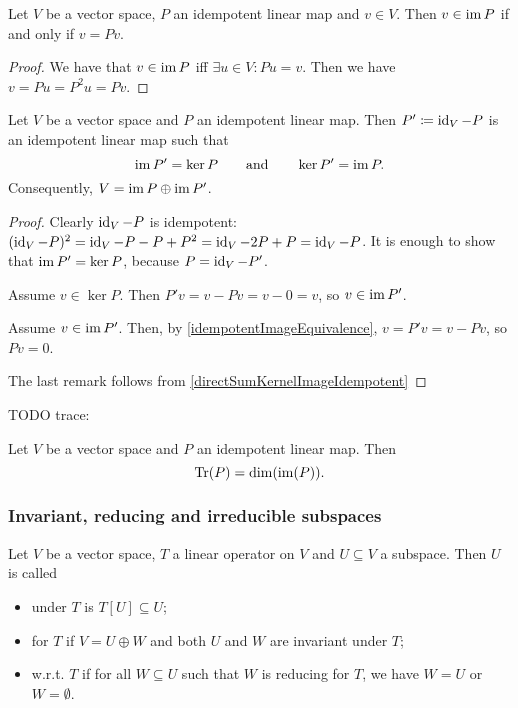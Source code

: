 \begin{lemma} \label{idempotentImageEquivalence}
Let $V$ be a vector space, $P$ an idempotent linear map and $v\in V$. Then $v\in \operatorname{im} P$ \textup{if and only if} $v = Pv$.
\end{lemma}
\begin{proof}
We have that $v\in \operatorname{im} P$ iff $\exists u\in V: Pu = v$. Then we have $v = Pu = P^2u = Pv$.
\end{proof}

\begin{lemma}
Let $V$ be a vector space and $P$ an idempotent linear map. Then $P' \coloneqq \operatorname{id}_V - P$ is an idempotent linear map such that
\[ \operatorname{im} P' = \ker P \qquad\text{and}\qquad \ker P' = \operatorname{im} P. \]
Consequently, $V = \operatorname{im} P\oplus \operatorname{im} P'$.
\end{lemma}
\begin{proof}
Clearly $\operatorname{id}_V - P$ is idempotent: $(\operatorname{id}_V - P)^2 = \operatorname{id}_V - P - P + P^2 = \operatorname{id}_V - 2P + P = \operatorname{id}_V - P$. It is enough to show that $\operatorname{im} P' = \ker P$, because $P = \operatorname{id}_V - P'$.

Assume $v\in \ker P$. Then $P'v = v - Pv = v-0 = v$, so $v\in \operatorname{im} P'$.

Assume $v\in \operatorname{im} P'$. Then, by \ref{idempotentImageEquivalence}, $v = P'v = v - Pv$, so $Pv = 0$.

The last remark follows from \ref{directSumKernelImageIdempotent}
\end{proof}



TODO trace:
\begin{lemma}
Let $V$ be a vector space and $P$ an idempotent linear map. Then
\[ \operatorname{Tr}(P) = \dim(\operatorname{im}(P)). \]
\end{lemma}


\subsubsection{Invariant, reducing and irreducible subspaces}
\begin{definition}
Let $V$ be a vector space, $T$ a linear operator on $V$ and $U\subseteq V$ a subspace. Then $U$ is called
\begin{itemize}
    \item {} under $T$ is $T[U]\subseteq U$;
    \item {} for $T$ if $V = U\oplus W$ and both $U$ and $W$ are invariant under $T$;
    \item {} w.r.t. $T$ if for all $W\subseteq U$ such that $W$ is reducing for $T$, we have $W = U$ or $W = \emptyset$.
\end{itemize}
\end{definition}

